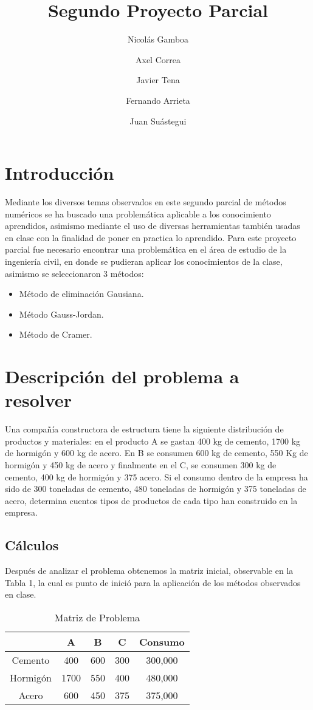 \documentclass[fleqn,10pt]{olplainarticle}
\title{Segundo Proyecto Parcial}
\author[1]{Nicolás Gamboa}
\author[2]{Axel Correa}
\author[3]{Javier Tena}
\author[4]{Fernando Arrieta}
\author[5]{Juan Suástegui}
\affil[1]{A01636262}
\affil[2]{A01636607}
\affil[3]{A01067470}
\affil[4]{A01336257}
\affil[5]{A01066742}
\begin{document}
\flushbottom
\maketitle
\thispagestyle{empty}

\section*{Introducción}

Mediante los diversos temas observados en este segundo parcial de métodos numéricos se ha buscado una problemática aplicable a los conocimiento aprendidos, asimismo mediante el uso de diversas herramientas también usadas en clase con la finalidad de poner en practica lo aprendido.
Para este proyecto parcial fue necesario encontrar una problemática en el área de estudio de la ingeniería civil, en donde se pudieran aplicar los conocimientos de la clase, asimismo se seleccionaron 3 métodos:
 \begin{itemize}
      \item Método de eliminación Gausiana.
      \item Método Gauss-Jordan.
      \item Método de Cramer.
\end{itemize}

\section*{Descripción del problema a resolver}

Una compañía constructora de estructura tiene la siguiente distribución de productos y materiales: en el producto A se gastan 400 kg de cemento, 1700 kg de hormigón y 600 kg de acero. En B se consumen 600 kg de cemento, 550 Kg de hormigón y 450 kg de acero y finalmente en el C, se consumen 300 kg de cemento, 400 kg de hormigón y 375 acero.
Si el consumo dentro de la empresa ha sido de 300 toneladas de cemento, 480 toneladas de hormigón y 375 toneladas de acero, determina cuentos tipos de productos de cada tipo han construido en la empresa.

    
\subsection*{Cálculos}
Después de analizar el problema obtenemos la matriz inicial, observable en la Tabla 1, la cual es punto de inició para la aplicación de los métodos observados en clase.

 \begin{table}[ht]
    \begin{center}
    \begin{tabular}{| c | c | c | c | c | }
    \hline
         & A & B & C & Consumo \\ \hline
        Cemento & 400 & 600 & 300 & 300,000 \\
        Hormigón & 1700 & 550 & 400 & 480,000 \\
        Acero & 600 & 450 & 375 & 375,000 \\ \hline
    \end{tabular}
    \caption{Matriz de Problema}
    \end{center}
\end{table}
\end{document}
